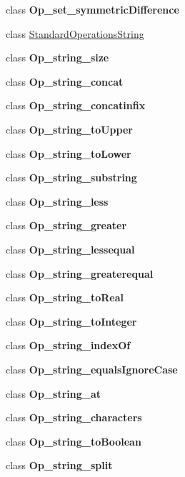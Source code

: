 \begin{DoxyCompactItemize}
\item 
class {\bfseries Op\-\_\-set\-\_\-symmetric\-Difference}
\item 
class \hyperlink{classorg_1_1tzi_1_1use_1_1uml_1_1ocl_1_1expr_1_1operations_1_1_standard_operations_string}{Standard\-Operations\-String}
\item 
class {\bfseries Op\-\_\-string\-\_\-size}
\item 
class {\bfseries Op\-\_\-string\-\_\-concat}
\item 
class {\bfseries Op\-\_\-string\-\_\-concatinfix}
\item 
class {\bfseries Op\-\_\-string\-\_\-to\-Upper}
\item 
class {\bfseries Op\-\_\-string\-\_\-to\-Lower}
\item 
class {\bfseries Op\-\_\-string\-\_\-substring}
\item 
class {\bfseries Op\-\_\-string\-\_\-less}
\item 
class {\bfseries Op\-\_\-string\-\_\-greater}
\item 
class {\bfseries Op\-\_\-string\-\_\-lessequal}
\item 
class {\bfseries Op\-\_\-string\-\_\-greaterequal}
\item 
class {\bfseries Op\-\_\-string\-\_\-to\-Real}
\item 
class {\bfseries Op\-\_\-string\-\_\-to\-Integer}
\item 
class {\bfseries Op\-\_\-string\-\_\-index\-Of}
\item 
class {\bfseries Op\-\_\-string\-\_\-equals\-Ignore\-Case}
\item 
class {\bfseries Op\-\_\-string\-\_\-at}
\item 
class {\bfseries Op\-\_\-string\-\_\-characters}
\item 
class {\bfseries Op\-\_\-string\-\_\-to\-Boolean}
\item 
class {\bfseries Op\-\_\-string\-\_\-split}
\end{DoxyCompactItemize}
